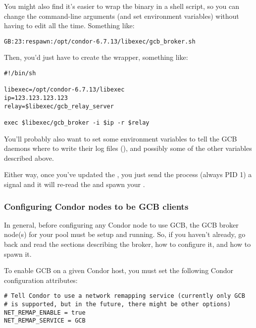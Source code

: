 You might also find it's easier to wrap the  binary
in a shell script, so you can change the command-line arguments (and
set environment variables) without having to edit 
all the time.
Something like:

\footnotesize
\begin{verbatim}
GB:23:respawn:/opt/condor-6.7.13/libexec/gcb_broker.sh
\end{verbatim}
\normalsize

Then, you'd just have to create the wrapper, something like: 

\footnotesize
\begin{verbatim}
#!/bin/sh

libexec=/opt/condor-6.7.13/libexec
ip=123.123.123.123
relay=$libexec/gcb_relay_server

exec $libexec/gcb_broker -i $ip -r $relay
\end{verbatim}
\normalsize

You'll probably also want to set some environment variables to tell
the GCB daemons where to write their log files (),
and possibly some of the other variables described above.

Either way, once you've updated the , you just send
the  process (always PID 1) a \verb@SIGHUP@ signal and it
will re-read the  and spawn your .


\subsubsection{\label{sec:GCB-condor-config}
Configuring Condor nodes to be GCB clients}

In general, before configuring any Condor node to use GCB, the GCB
broker node(s) for your pool must be setup and running.
So, if you haven't already, go back and read the sections describing
the broker, how to configure it, and how to spawn it.

To enable GCB on a given Condor host, you must set the following
Condor configuration attributes:

\footnotesize
\begin{verbatim}
# Tell Condor to use a network remapping service (currently only GCB
# is supported, but in the future, there might be other options)
NET_REMAP_ENABLE = true
NET_REMAP_SERVICE = GCB
\end{verbatim}
\normalsize


